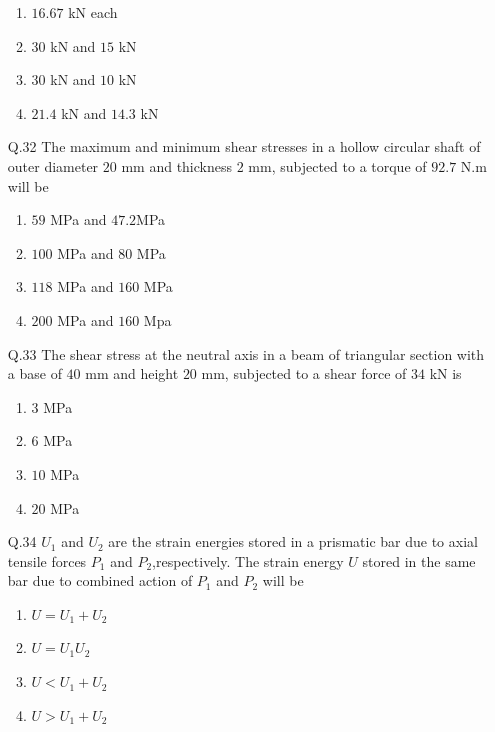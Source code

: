 \documentclass[journal,12pt,onecolumn]{IEEEtran}
\theoremstyle{remark}
\begin{document}
\begin{enumerate}
\begin{figure}[h!]
\end{figure}
\begin{enumerate}
                \item $16.67$ kN each
                \item $30$ kN and $15$ kN
                \item $30$ kN and $10$ kN
                \item $21.4$ kN and $14.3$ kN
        \end{enumerate}
\item[Q.32] The maximum and minimum shear stresses in a hollow circular shaft of outer diameter $20$ mm and thickness $2$ mm, subjected to a torque of $92.7$ N.m will be
	\begin{enumerate}
                \item $59$ MPa and $47.2$MPa
                \item $100$ MPa and $80$ MPa
                \item $118$ MPa and $160$ MPa
                \item $200$ MPa and $160$ Mpa
        \end{enumerate}
\item[Q.33] The shear stress at the neutral axis in a beam of triangular section with a base of $40$ mm and height $20$ mm, subjected to a shear force of $34$ kN is
	\begin{enumerate}
                \item $3$ MPa
                \item $6$ MPa
                \item $10$ MPa
                \item $20$ MPa
        \end{enumerate}
\item[Q.34] $U_1$ and $U_2$ are the strain energies stored in a prismatic bar due to axial tensile forces $P_1$ and $P_2$,respectively. The strain energy $U$ stored in the same bar due to combined action of $P_1$ and $P_2$ will be 
\begin{enumerate}
                \item $U=U_1+U_2$
                \item $U=U_1U_2$ 
                \item $U<U_1+U_2$ 
                \item $U>U_1+U_2$ 
        \end{enumerate}     

\end{enumerate}
\end{document}
